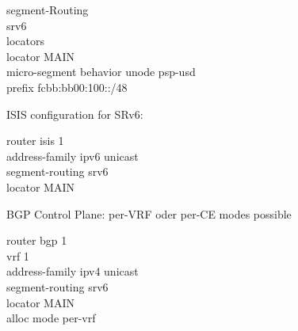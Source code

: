 \ttfamily
\vspace{3mm}
\noindent
segment-Routing \\
\hspace*{1em}srv6\\
\hspace*{2em}locators\\
\hspace*{3em}locator MAIN\\
\hspace*{4em}micro-segment behavior unode psp-usd\\
\hspace*{4em}prefix fcbb:bb00:100::/48\\    
\rmfamily

\vspace{5mm}
\noindent
ISIS configuration for SRv6:

\ttfamily
\vspace{3mm}
\noindent
router isis 1\\
\hspace*{1em}address-family ipv6 unicast\\
\hspace*{2em}segment-routing srv6\\
\hspace*{3em}locator MAIN
\rmfamily

\vspace{5mm}
\noindent
BGP Control Plane: per-VRF oder per-CE modes possible

\ttfamily
\vspace{3mm}
\noindent
router bgp 1\\
\hspace*{1em}vrf 1\\
\hspace*{2em}address-family ipv4 unicast\\
\hspace*{3em}segment-routing srv6\\
\hspace*{4em}locator MAIN\\
\hspace*{4em}alloc mode per-vrf\\
\rmfamily
